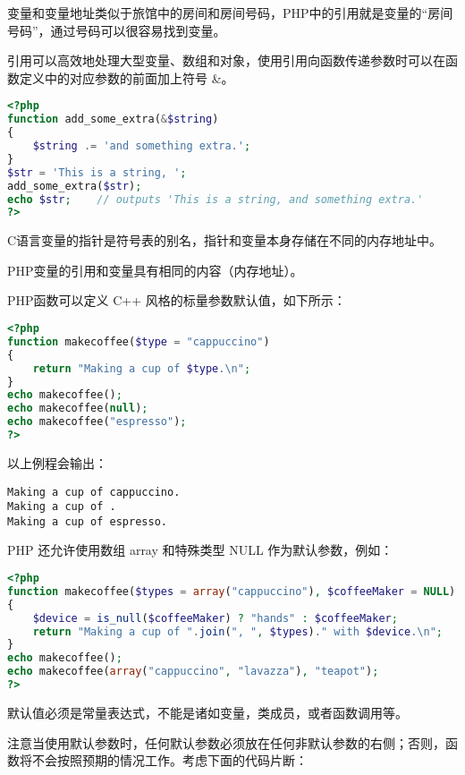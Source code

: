 变量和变量地址类似于旅馆中的房间和房间号码，PHP中的引用就是变量的“房间号码”，通过号码可以很容易找到变量。

引用可以高效地处理大型变量、数组和对象，使用引用向函数传递参数时可以在函数定义中的对应参数的前面加上符号 \&。

\begin{lstlisting}[language=PHP]
<?php
function add_some_extra(&$string)
{
    $string .= 'and something extra.';
}
$str = 'This is a string, ';
add_some_extra($str);
echo $str;    // outputs 'This is a string, and something extra.'
?>
\end{lstlisting}

\begin{compactitem}
\item C语言变量的指针是符号表的别名，指针和变量本身存储在不同的内存地址中。
\item PHP变量的引用和变量具有相同的内容（内存地址）。
\end{compactitem}




PHP函数可以定义 C++ 风格的标量参数默认值，如下所示：

\begin{lstlisting}[language=PHP]
<?php
function makecoffee($type = "cappuccino")
{
    return "Making a cup of $type.\n";
}
echo makecoffee();
echo makecoffee(null);
echo makecoffee("espresso");
?>
\end{lstlisting}

以上例程会输出：

\begin{verbatim}
Making a cup of cappuccino.
Making a cup of .
Making a cup of espresso.
\end{verbatim}

PHP 还允许使用数组 array 和特殊类型 NULL 作为默认参数，例如：

\begin{lstlisting}[language=PHP]
<?php
function makecoffee($types = array("cappuccino"), $coffeeMaker = NULL)
{
    $device = is_null($coffeeMaker) ? "hands" : $coffeeMaker;
    return "Making a cup of ".join(", ", $types)." with $device.\n";
}
echo makecoffee();
echo makecoffee(array("cappuccino", "lavazza"), "teapot");
?>
\end{lstlisting}


默认值必须是常量表达式，不能是诸如变量，类成员，或者函数调用等。

注意当使用默认参数时，任何默认参数必须放在任何非默认参数的右侧；否则，函数将不会按照预期的情况工作。考虑下面的代码片断：

